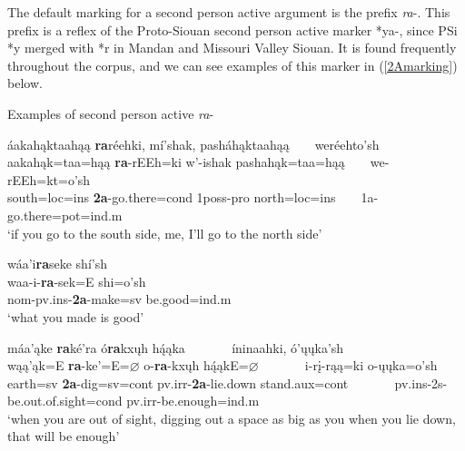 \label{Para2A}

The default marking for a second person active argument is the prefix \textit{ra}-. This prefix is a reflex of the Proto-Siouan second person active marker *ya-, since PSi *y merged with *r in Mandan and Missouri Valley Siouan. It is found frequently throughout the corpus, and we can see examples of this marker in (\ref{2Amarking}) below.

\begin{exe}

\item\label{2Amarking} Examples of second person active \textit{ra}-

	\begin{xlist}
	
	\item \glll áakahąktaahąą \textbf{ra}réehki, mí'shak, pasháhąktaahąą ~ ~ weréehto'sh\\
	aakahąk=taa=hąą \textbf{ra}-rEEh=ki w'-ishak pashahąk=taa=hąą ~ ~ we-rEEh=kt=o'sh\\
	\textnormal{south}=loc=ins \textbf{2a}-\textnormal{go.there}=cond 1poss-\textnormal{pro} \textnormal{north}=loc=ins ~ ~  1a-\textnormal{go.there}=pot=ind.m\\
	\glt `if you go to the south side, me, I'll go to the north side' \citep[3]{hollow1973a}
	
	\item \glll wáa'i\textbf{ra}seke shí'sh\\
	waa-i-\textbf{ra}-sek=E shi=o'sh\\
	nom-pv.ins-\textbf{2a}-\textnormal{make}=sv \textnormal{be.good}=ind.m\\
	\glt `what you made is good' \citep[11]{hollow1973a}
	
	\item \glll máa'ąke \textbf{ra}ké'ra ó\textbf{ra}kxųh hą́ąka ~ ~ ~ ~  íninaahki, ó'ųųka'sh\\
	wąą'ąk=E \textbf{ra}-ke'=E=$\varnothing$ o-\textbf{ra}-kxųh hą́ąkE=$\varnothing$ ~ ~ ~ ~  i-rį-rąą=ki o-ųųka=o'sh\\
	\textnormal{earth}=sv \textbf{2a}-\textnormal{dig}=sv=cont pv.irr-\textbf{2a}-\textnormal{lie.down} \textnormal{stand}.aux=cont ~ ~ ~ ~ pv.ins-2s-\textnormal{be.out.of.sight}=cond pv.irr-\textnormal{be.enough}=ind.m\\
	\glt `when you are out of sight, digging out a space as big as you when you lie down, that will be enough' \citep[25]{hollow1973a}
	

\end{xlist}
\end{exe}
